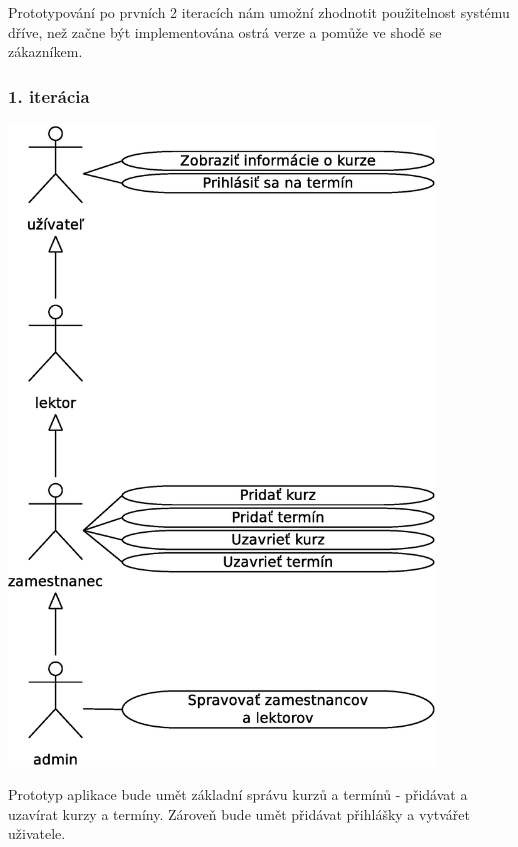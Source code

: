 \documentclass[12pt,a4paper,titlepage,final]{report}
\begin{document}
Prototypování po prvních 2 iteracích nám umožní zhodnotit použitelnost systému dříve, než začne být implementována ostrá verze a pomůže ve shodě se zákazníkem.
	
	\subsubsection{1. iterácia}
		\begin{center}
			\captionsetup{type=figure}
			\includegraphics[height=17cm]{img/use_case_iter1.eps}
		\end{center}
		
Prototyp aplikace bude umět základní správu kurzů a termínů - přidávat a uzavírat kurzy a termíny. Zároveň bude umět přidávat přihlášky a vytvářet uživatele.
	
\end{document}
